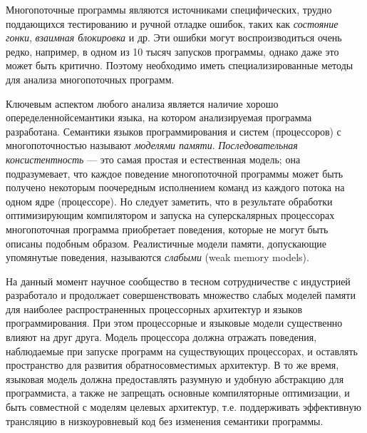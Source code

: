 
{\actuality}
Многопоточные программы являются источниками специфических, трудно поддающихся
тестированию и ручной отладке ошибок, таких как \emph{состояние гонки}, \emph{взаимная блокировка} и др.
Эти ошибки могут воспроизводиться очень редко, например, в одном из 10 тысяч запусков
программы, однако даже это может быть критично.
Поэтому необходимо иметь специализированные методы для анализа многопоточных программ.

Ключевым аспектом любого анализа является наличие хорошо опеределеннойсемантики языка,
на котором анализируемая программа разработана. Семантики языков программирования и систем (процессоров)
с многопоточностью называют \emph{моделями памяти}.
\emph{Последовательная консистентность} --- это самая простая и естественная модель;
она подразумевает, что каждое поведение многопоточной программы может быть
получено некоторым поочередным исполнением команд из каждого потока на одном ядре
(процессоре). Но следует заметить, что в результате обработки оптимизирующим
компилятором и запуска на суперскалярных процессорах многопоточная программа
приобретает поведения, которые не могут быть описаны подобным образом.
Реалистичные модели памяти, допускающие упомянутые поведения, называются \emph{слабыми} (weak memory models).

На данный момент научное сообщество в тесном сотрудничестве с индустрией
разработало и продолжает совершенствовать множество слабых моделей памяти для
наиболее распространенных процессорных архитектур и языков программирования.
При этом процессорные и языковые модели существенно влияют на друг друга.
Модель процессора должна отражать поведения, наблюдаемые при запуске программ
на существующих процессорах, и оставлять пространство для развития
обратносовместимых архитектур. В то же время, языковая модель должна
предоставлять разумную и удобную абстракцию для программиста, а также не запрещать основные
компиляторные оптимизации, и быть совместной с моделям целевых архитектур,
т.е. поддерживать эффективную трансляцию в низкоуровневый код без изменения
семантики программы.

